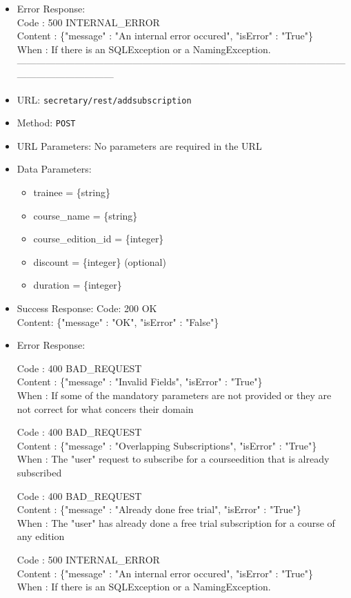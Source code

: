 \begin{itemize}
    \item Error Response:\\
    Code : 500 INTERNAL\_ERROR\\
    Content : \{"message" : "An internal error occured", "isError" : "True"\}\\
    When : If there is an SQLException or a NamingException.\\
------------------------------------------------------------------------------------------------------------------------------------
    \item URL: \texttt{secretary/rest/addsubscription}
    \item Method: \texttt{POST}
    \item URL Parameters: No parameters are required in the URL
    \item Data Parameters: 
    \begin{itemize}
    	\item trainee = \{string\}
     	\item course\_name = \{string\}
     	\item course\_edition\_id = \{integer\}
     	\item discount = \{integer\} (optional)
     	\item duration = \{integer\}
    \end{itemize}
    \item Success Response:
    Code: 200 OK\\
    Content:  \{"message" : "OK", "isError" : "False"\}
    \item Error Response:
	
	Code : 400 BAD\_REQUEST\\
	Content : \{"message" : "Invalid Fields", "isError" : "True"\}\\
	When : If some of the mandatory parameters are not provided or they are not correct for what concers their domain
	
	Code : 400 BAD\_REQUEST\\
	Content : \{"message" : "Overlapping Subscriptions", "isError" : "True"\}\\
    When : The "user" request to subscribe for a courseedition that is already subscribed
	
	Code : 400 BAD\_REQUEST\\
	Content : \{"message" : "Already done free trial", "isError" : "True"\}\\
	When : The "user" has already done a free trial subscription for a course of any edition
	    
    Code : 500 INTERNAL\_ERROR\\
    Content : \{"message" : "An internal error occured", "isError" : "True"\}\\
    When : If there is an SQLException or a NamingException.
    
    
\end{itemize}

